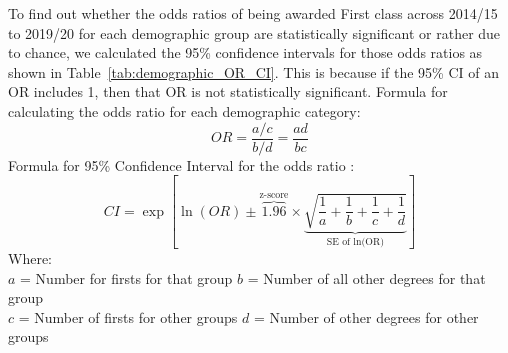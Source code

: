 \documentclass[11pt,a4paper]{article}
\begin{document}
To find out whether the odds ratios of being awarded First class across 2014/15 to 2019/20 for each demographic group are statistically significant or rather due to chance, we calculated the 95\% confidence intervals for those odds ratios as shown in Table~\ref{tab:demographic_OR_CI}. This is because if the 95\% CI of an OR includes 1, then that OR is not statistically significant.
\newline
\setlength{\belowdisplayskip}{4pt} \setlength{\belowdisplayshortskip}{4pt}
\setlength{\abovedisplayskip}{4pt} \setlength{\abovedisplayshortskip}{4pt}
Formula for calculating the odds ratio for each demographic category:
\begin{equation}
    \label{fds-project-template:demographic_odds_ratio_eq}
    OR =\frac{a/c}{b/d} = \frac{ad}{bc}
\end{equation}
Formula for 95\% Confidence Interval for the odds ratio \cite{NCBI_Odds_ratio}:
\setlength{\belowdisplayskip}{4pt} \setlength{\belowdisplayshortskip}{4pt}
\setlength{\abovedisplayskip}{4pt} \setlength{\abovedisplayshortskip}{4pt}
\begin{equation}
    \label{fds-project-template:demographic_ci_odds_ratio_eq}
    CI = \exp{\left[\ln{(OR)}\pm\overbrace{1.96}^\text{z-score}\times\underbrace{\sqrt{ \frac{1}{a} + \frac{1}{b}+ \frac{1}{c} + \frac{1}{d}}}_\text{SE of ln(OR)}\right]}
\end{equation}
Where:\\
$a$ = Number for firsts for that group \quad $b$ = Number of all other degrees for that group\\
$c$ = Number of firsts for other groups \quad $d$ = Number of other degrees for other groups\\
\end{document}
